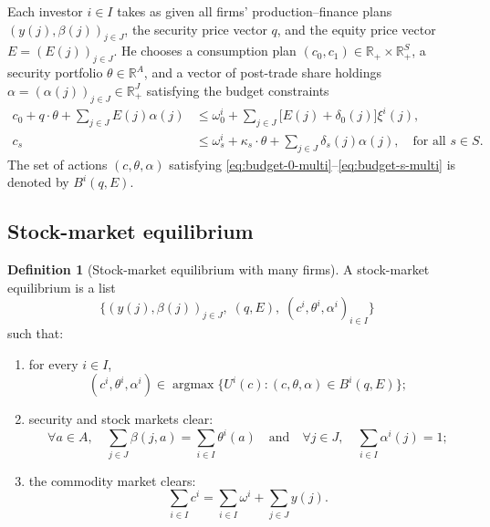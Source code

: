 \documentclass[11pt,a4paper,oneside]{book}
\def\R{\mathbb{R}}
\def\leq{\leqslant}
\def\et{\quad \text{and} \quad}
\DeclareMathOperator*{\argmax}{argmax}
\theoremstyle{plain}
\theoremstyle{definition}
\newtheorem{definition}[theorem]{Definition}
\theoremstyle{remark}
\numberwithin{equation}{chapter}
\begin{document}
Each investor $i \in I$ takes as given all firms' production--finance plans $(y(j), \beta(j))_{j \in J}$, the security price vector $q$, and the equity price vector $E = (E(j))_{j \in J}$.
He chooses a consumption plan $(c_0, c_1) \in \R_+ \times \R_+^S$, a security portfolio $\theta \in \R^A$, and a vector of post-trade share holdings $\alpha = (\alpha(j))_{j \in J} \in \R_+^J$ satisfying the budget constraints
\begin{align}
  c_0 + q \cdot \theta + \sum_{j \in J} E(j) \alpha(j)
  &\leq
  \omega^i_0 + \sum_{j \in J} \bigl[E(j) + \delta_0(j)\bigr] \xi^i(j),
  \label{eq:budget-0-multi}\\[2pt]
  c_s
  &\leq
  \omega^i_s + \kappa_s \cdot \theta + \sum_{j \in J} \delta_s(j) \alpha(j),
  \quad \text{for all $s\in S$}.
  \label{eq:budget-s-multi}
\end{align}
The set of actions $(c, \theta, \alpha)$ satisfying \eqref{eq:budget-0-multi}--\eqref{eq:budget-s-multi} is denoted by $B^i(q, E)$.

\subsection{Stock-market equilibrium}

\begin{definition}[Stock-market equilibrium with many firms]\label{def:eq-multi}
A stock-market equilibrium is a list
\begin{equation*}
  \bigl\{ (y(j), \beta(j))_{j \in J}, \; (q, E), \; (c^i, \theta^i, \alpha^i)_{i \in I} \bigr\}
\end{equation*}
such that:
\begin{enumerate}
  \item[(a)] for every $i \in I$,
  \begin{equation*}
    (c^i, \theta^i, \alpha^i) \in \argmax \bigl\{ U^i(c) \colon (c, \theta, \alpha) \in B^i(q, E) \bigr\};
  \end{equation*}
  \item[(b)] security and stock markets clear:
  \begin{equation*}
    \forall a \in A, \quad \sum_{j \in J} \beta(j, a) = \sum_{i \in I} \theta^i(a)
    \et
    \forall j \in J, \quad \sum_{i \in I} \alpha^i(j) = 1;
  \end{equation*}
  \item[(c)] the commodity market clears:
  \begin{equation*}
    \sum_{i \in I} c^i = \sum_{i \in I} \omega^i + \sum_{j \in J} y(j).
  \end{equation*}
\end{enumerate}
\end{definition}
\end{document}
